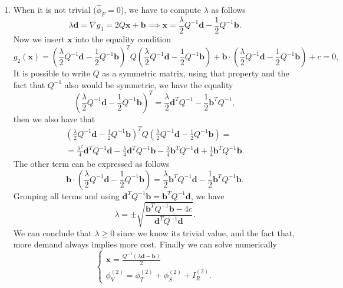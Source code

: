 \documentclass[12pt]{article}
\theoremstyle{definition}
\theoremstyle{remark}
\begin{document}
\begin{enumerate}
\item When it is not trivial ($\hat{\phi}_F=0$), we have to compute $\lambda$ as follows
\begin{equation*}
\lambda\bm{d}=\nabla g_3=2Q\bm{x}+\bm{b}\implies\bm{x}=\frac{\lambda}{2}Q^{-1}\bm{d}-\frac{1}{2}Q^{-1}\bm{b}.
\end{equation*}
Now we insert $\bm{x}$ into the equality condition
\begin{equation*}
g_2(\bm{x})=\left(\frac{\lambda}{2}Q^{-1}\bm{d}-\frac{1}{2}Q^{-1}\bm{b}\right)^TQ\left(\frac{\lambda}{2}Q^{-1}\bm{d}-\frac{1}{2}Q^{-1}\bm{b}\right)+\bm{b}\cdot\left(\frac{\lambda}{2}Q^{-1}\bm{d}-\frac{1}{2}Q^{-1}\bm{b}\right)+c=0,
\end{equation*}
It is possible to write $Q$ as a symmetric matrix, using that property and the fact that $Q^{-1}$ also would be symmetric, we have the equality
\begin{equation*}
\left(\frac{\lambda}{2}Q^{-1}\bm{d}-\frac{1}{2}Q^{-1}\bm{b}\right)^T=\frac{\lambda}{2}\bm{d}^TQ^{-1}-\frac{1}{2}\bm{b}^TQ^{-1},
\end{equation*}
then we also have that
\begin{multline*}
\left(\frac{\lambda}{2}Q^{-1}\bm{d}-\frac{1}{2}Q^{-1}\bm{b}\right)^TQ\left(\frac{\lambda}{2}Q^{-1}\bm{d}-\frac{1}{2}Q^{-1}\bm{b}\right)=\\
=\frac{\lambda^2}{4}\bm{d}^TQ^{-1}\bm{d}-\frac{\lambda}{4}\bm{d}^TQ^{-1}\bm{b}-\frac{\lambda}{4}\bm{b}^TQ^{-1}\bm{d}+\frac{1}{4}\bm{b}^TQ^{-1}\bm{b}.
\end{multline*}
The other term can be expressed as follows
\begin{equation*}
\bm{b}\cdot\left(\frac{\lambda}{2}Q^{-1}\bm{d}-\frac{1}{2}Q^{-1}\bm{b}\right)=\frac{\lambda}{2}\bm{b}^TQ^{-1}\bm{d}-\frac{1}{2}\bm{b}^TQ^{-1}\bm{b}.
\end{equation*}
Grouping all terms and using $\bm{d}^TQ^{-1}\bm{b}=\bm{b}^TQ^{-1}\bm{d}$, we have
\begin{equation*}
\lambda=\pm\sqrt{\frac{\bm{b}^TQ^{-1}\bm{b}-4c}{\bm{d}^TQ^{-1}\bm{d}}}.
\end{equation*}
We can conclude that $\lambda\geq0$ since we know its trivial value, and the fact that, more demand always implies more cost. Finally we can solve numerically
\begin{equation*}
\begin{cases}
\bm{x}=\frac{Q^{-1}(\lambda\bm{d}-\bm{b})}{2}\\
\phi_V^{(2)}=\phi_T^{(2)}+\phi_S^{(2)}+I_R^{(2)}.\end{cases}
\end{equation*}

\end{enumerate}
\end{document}
